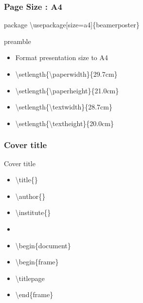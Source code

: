 \documentclass[ aspectratio=169,  10pt,blue,xcolor=pdftex,dvipsnames,table,handout,notes]{beamer}
\begin{document}
		\begin{frame}[t]
		\frametitle{Page Size : A4}

			\begin{block} {package}
			\textbackslash usepackage[size=a4]\{beamerposter\}
			\end{block}


			\begin{block}{preamble}
			\begin{itemize}
			\item[]	Format presentation size to A4
			\item[]	\textbackslash setlength\{\textbackslash paperwidth\}\{29.7cm\}
			\item[]	\textbackslash setlength\{\textbackslash paperheight\}\{21.0cm\}
			\item[]	\textbackslash setlength\{\textbackslash textwidth\}\{28.7cm\}
			\item[]	\textbackslash setlength\{\textbackslash textheight\}\{20.0cm\}   
			\end{itemize}
			\end{block}


		\end{frame}



		\begin{frame}
		\frametitle{Cover title}

			\begin{block}{Cover title}
			\begin{itemize}
			\item[] \textbackslash title\{\} 
			\item[] \textbackslash author\{\} 
			\item[] \textbackslash institute\{\} 
			\item[] 
			\item[] \textbackslash begin\{document\}
			\item[] \textbackslash begin\{frame\}
			\item[] \textbackslash titlepage
			\item[] \textbackslash end\{frame\}
			\end{itemize}
			\end{block}


		\end{frame}
\end{document}
